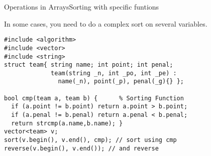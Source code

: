 \begin{frame}[fragile]{Operations in Arrays}{Sorting with specific funtions}
{\small
  In some cases, you need to do a complex sort on several variables.
  \begin{block}{}
\begin{verbatim}
#include <algorithm>
#include <vector>
#include <string>
struct team{ string name; int point; int penal;
             team(string _n, int _po, int _pe) :
               name(_n), point(_p), penal(_g){} };

bool cmp(team a, team b) {      % Sorting Function
  if (a.point != b.point) return a.point > b.point;
  if (a.penal != b.penal) return a.penal < b.penal;
  return strcmp(a.name,b.name); }
vector<team> v;
sort(v.begin(), v.end(), cmp); // sort using cmp
reverse(v.begin(), v.end()); // and reverse
\end{verbatim}
\end{block}}
\end{frame}

